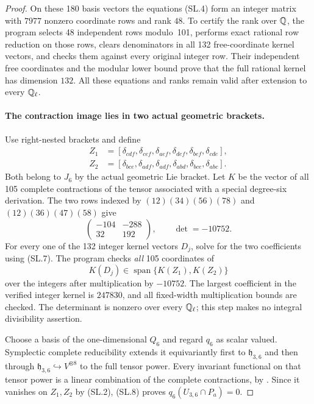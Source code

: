 \begin{proof}
On these 180 basis vectors the equations (SL.4) form an integer
matrix with $7977$ nonzero coordinate rows and rank $48$.
To certify the rank over $\mathbb Q$, the program selects 48 independent
rows modulo~101, performs exact rational row reduction on those
rows, clears denominators in all 132 free-coordinate kernel
vectors, and checks them against every original integer row.
Their independent free coordinates and the modular lower bound
prove that the full rational kernel has dimension $132$.
All these equations and ranks remain valid after extension to
every $\mathbb Q_\ell$.

\paragraph{The contraction image lies in two actual geometric brackets.}
Use right-nested brackets and define
\[
\begin{split}
 Z_1&=[\delta_{cdf},\delta_{cef},\delta_{aef},
                  \delta_{def},\delta_{bef},\delta_{cde}],\\
 Z_2&=[\delta_{bce},\delta_{adf},\delta_{adf},
                  \delta_{abd},\delta_{bce},\delta_{abc}].
\end{split}                                                   \tag{SL.6}
\]
Both belong to $J_6$ by the actual geometric Lie bracket.
Let $K$ be the vector of all 105 complete contractions of
the tensor associated with a special degree-six derivation.
The two rows indexed by
$(12)(34)(56)(78)$ and $(12)(36)(47)(58)$ give
\[
 \begin{pmatrix}-104&-288\\32&192\end{pmatrix},
             \qquad\det=-10752.                           \tag{SL.7}
\]
For every one of the 132 integer kernel vectors $D_j$, solve
for the two coefficients using (SL.7). The program checks
\emph{all} 105 coordinates of
\[
                 K(D_j)\in\operatorname{span}\{K(Z_1),K(Z_2)\}
                                                               \tag{SL.8}
\]
over the integers after multiplication by $-10752$.
The largest coefficient in the verified integer kernel is
$247830$, and all fixed-width multiplication bounds are checked.
The determinant is nonzero over every $\mathbb Q_\ell$; this step
makes no integral divisibility assertion.

Choose a basis of the one-dimensional $Q_6$ and regard $q_6$
as scalar valued. Symplectic complete reducibility extends it
equivariantly first to $\mathfrak h_{3,6}$ and then through
$\mathfrak h_{3,6}\hookrightarrow V^{\otimes8}$ to the full
tensor power. Every invariant functional on that tensor power
is a linear combination of the complete contractions, by
\cite[Proposition~2.1, p.~8]{AuditMoritaSakasaiSuzuki2015v2}.
Since it vanishes on $Z_1,Z_2$ by (SL.2), (SL.8) proves
$q_6(U_{3,6}\cap P_a)=0$.


\end{proof}
